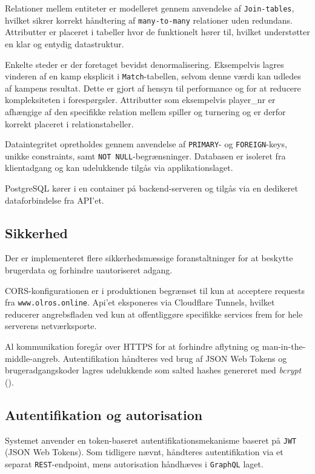 Relationer mellem entiteter er modelleret gennem anvendelse af \texttt{Join-tables}, hvilket sikrer korrekt håndtering af
\texttt{many-to-many} relationer uden redundans.
Attributter er placeret i tabeller hvor de funktionelt hører til,
hvilket understøtter en klar og entydig datastruktur.

Enkelte steder er der foretaget bevidst denormalisering.
Eksempelvis lagres vinderen af en kamp eksplicit i \texttt{Match}-tabellen, selvom denne værdi kan udledes af kampens resultat.
Dette er gjort af hensyn til performance og for at reducere kompleksiteten i forespørgsler.
Attributter som eksempelvis player\_nr er afhængige af den specifikke relation mellem spiller og turnering og er derfor
korrekt placeret i relationstabeller.

Dataintegritet opretholdes gennem anvendelse af \texttt{PRIMARY}- og \texttt{FOREIGN}-keys, unikke constraints, samt
\texttt{NOT NULL}-begrænsninger.
Databasen er isoleret fra klientadgang og kan udelukkende tilgås via applikationslaget.

PostgreSQL kører i en container på backend-serveren og tilgås via en dedikeret dataforbindelse fra API'et.

\subsection{Sikkerhed}

Der er implementeret flere sikkerhedsmæssige foranstaltninger for at beskytte brugerdata og forhindre uautoriseret adgang.

CORS-konfigurationen er i produktionen begrænset til kun at acceptere requests fra \texttt{www.olros.online}.
Api'et eksponeres via Cloudflare Tunnels, hvilket reducerer angrebsfladen ved kun at offentliggøre specifikke
services frem for hele serverens netværksporte.

Al kommunikation foregår over HTTPS for at forhindre aflytning og man-in-the-middle-angreb.
Autentifikation håndteres ved brug af JSON Web Tokens og brugeradgangskoder lagres udelukkende som salted hashes genereret med \textit{bcrypt} (\cite{271659}).

\subsection{Autentifikation og autorisation}

Systemet anvender en token-baseret autentifikationsmekanisme baseret på \texttt{JWT} (JSON Web Tokens).
Som tidligere nævnt, håndteres autentifikation via et separat \texttt{REST}-endpoint, mens autorisation
håndhæves i \texttt{GraphQL} laget.

